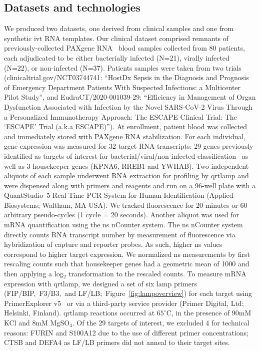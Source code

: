 \documentclass[../thesis.tex]{subfiles}
\begin{document}
\subsection{Datasets and technologies \label{sec:data}}
We produced two datasets, one derived from clinical samples and one from synthetic \gls{ivt} RNA templates. Our clinical dataset comprised remnants of previously-collected PAXgene RNA~\citep{ram-mohan_using_2022} blood samples collected from 80 patients, each adjudicated to be either bacterially infected (N=21), virally infected (N=22), or non-infected (N=37). 
Patients samples were taken from two trials (clinicaltrial.gov/NCT03744741: ``HostDx Sepsis in the Diagnosis and Prognosis of Emergency Department Patients With Suspected Infections: a Multicenter Pilot Study'', and EudraCT/2020-001039-29: ``Efficiency in Management of Organ Dysfunction Associated with Infection by the Novel SARS-CoV-2 Virus Through a Personalized Immunotherapy Approach: The ESCAPE Clinical Trial: The `ESCAPE' Trial (a.k.a ESCAPE)'').
At enrollment, patient blood was collected and immediately stored with PAXgene RNA stabilization. For each individual, gene expression was measured for 32 target RNA transcripts: 29 genes previously identified as targets of interest for bacterial/viral/non-infected classification~\citep{he_optimization_2021} as well as 3 housekeeper genes (KPNA6, RREB1 and YWHAB). Two independent aliquots of each sample underwent RNA extraction for profiling by \gls{qrtlamp} and were dispensed along with primers and reagents and run on a 96-well plate with a QuantStudio\texttrademark~5 Real-Time PCR System for Human Identification (Applied Biosystems; Waltham, MA USA). We tracked fluorescence for 20 minutes or 60 arbitrary pseudo-cycles (1 cycle = 20 seconds). Another aliquot was used for mRNA quantification using the \gls{ns} nCounter system. The \gls{ns} nCounter system  directly counts RNA transcript number by measurement of fluorescence via hybridization of capture and reporter probes. As such, higher \gls{ns} values correspond to higher target expression. We normalized \gls{ns} measurements by first rescaling counts such that housekeeper genes had a geometric mean of 1000 and then applying a \textsf{log}$_{2}$ transformation to the rescaled counts. To measure mRNA expression with \gls{qrtlamp}, we designed a set of six \gls{lamp} primers (FIP/BIP,~F3/B3,~and  LF/LB;~Figure~\ref{fig:lampoverview}) for each target using PrimerExplorer v5~\citep{eiken_primerexplorer_2019} or via a third-party service provider (Primer Digital, Ltd; Helsinki, Finland). \gls{qrtlamp} reactions occurred at $65^{\circ}$C, in the presence of 90mM KCl and 8mM MgSO$_4$. Of the 29 targets of interest, we excluded 4 for technical reasons: {FURIN} and {S100A12} due to the use of different primer concentrations; {CTSB} and {DEFA4} as LF/LB primers did not anneal to their target sites.
\end{document}
